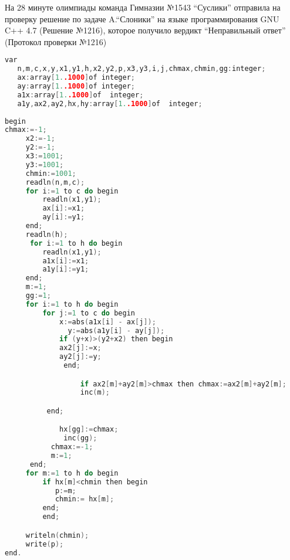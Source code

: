 На 28 минуте олимпиады команда Гимназии №1543 ``Суслики'' отправила на проверку решение по задаче A.``Слоники'' на языке программирования GNU C++ 4.7 (Решение №1216), которое получило вердикт ``Неправильный ответ'' (Протокол проверки №1216)
\begin{lstlisting}[language=c++, label=r1216, caption=Решение №1216]
var
   n,m,c,x,y,x1,y1,h,x2,y2,p,x3,y3,i,j,chmax,chmin,gg:integer;
   ax:array[1..1000]of integer;
   ay:array[1..1000]of integer;
   a1x:array[1..1000]of  integer;
   a1y,ax2,ay2,hx,hy:array[1..1000]of  integer;
   
begin
chmax:=-1;
     x2:=-1;
     y2:=-1;
     x3:=1001;
     y3:=1001;
     chmin:=1001;
     readln(n,m,c);
     for i:=1 to c do begin
         readln(x1,y1);
         ax[i]:=x1;
         ay[i]:=y1;
     end;
     readln(h);
      for i:=1 to h do begin
         readln(x1,y1);
         a1x[i]:=x1;
         a1y[i]:=y1;
     end;
     m:=1;
     gg:=1;
     for i:=1 to h do begin
         for j:=1 to c do begin
             x:=abs(a1x[i] - ax[j]);
               y:=abs(a1y[i] - ay[j]);
             if (y+x)>(y2+x2) then begin
             ax2[j]:=x;
             ay2[j]:=y;
              end;

                  if ax2[m]+ay2[m]>chmax then chmax:=ax2[m]+ay2[m];
                  inc(m);

          end;

             hx[gg]:=chmax;
              inc(gg);
           chmax:=-1;
           m:=1;
      end;
     for m:=1 to h do begin
         if hx[m]<chmin then begin
            p:=m;
            chmin:= hx[m];
         end;
         end;

     writeln(chmin);
     write(p);
end.
\end{lstlisting}

